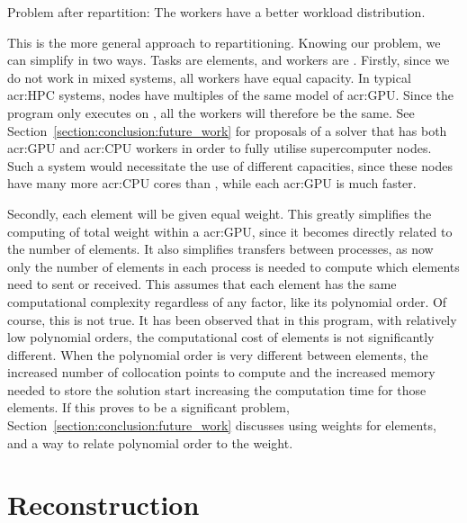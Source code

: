 \begin{table}[H]
\begin{center}
        \caption{Problem after repartition: The workers have a better workload distribution.}\label{table:after_repartition}
    \end{center}
\end{table}

This is the more general approach to repartitioning. Knowing our problem, we can simplify in two
ways. Tasks are elements, and workers are . Firstly, since we do not work in
mixed systems, all workers have equal capacity. In typical \acrshort{acr:HPC} systems, nodes have
multiples of the same model of \acrshort{acr:GPU}. Since the program only executes on
, all the workers will therefore be the same. See
Section~\ref{section:conclusion:future_work} for proposals of a solver that has both
\acrshort{acr:GPU} and \acrshort{acr:CPU} workers in order to fully utilise supercomputer nodes.
Such a system would necessitate the use of different capacities, since these nodes have many more
\acrshort{acr:CPU} cores than , while each \acrshort{acr:GPU} is much faster. 

Secondly, each element will be given equal weight. This greatly simplifies the computing of total
weight within a \acrshort{acr:GPU}, since it becomes  directly related to the number of elements. It
also simplifies transfers between processes, as now only the number of elements in each process is
needed to compute which elements need to sent or received. This assumes that each element has the
same computational complexity regardless of any factor, like its polynomial order. Of course, this
is not true. It has been observed that in this program, with relatively low polynomial orders, the
computational cost of elements is not significantly different. When the polynomial order is very
different between elements, the increased number of collocation points to compute and the increased
memory needed to store the solution start increasing the computation time for those elements. If
this proves to be a significant problem, Section~\ref{section:conclusion:future_work} discusses
using weights for elements, and a way to relate polynomial order to the weight. 

\section{Reconstruction}\label{section:load_balancing:reconstruction}

